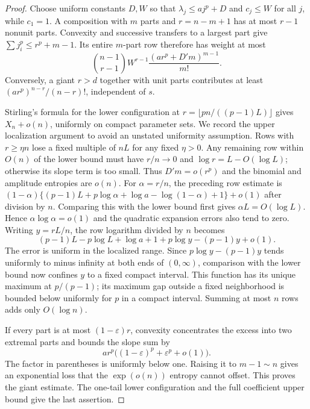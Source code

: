 \documentclass[11pt,a4paper]{article}
\numberwithin{equation}{section}
\theoremstyle{definition}
\theoremstyle{remark}
\begin{document}
\begin{proof}
Choose uniform constants $D,W$ so that
$\lambda_j\le a j^p+D$ and $c_j\le W$ for all $j$, while $c_1=1$.
A composition with $m$ parts and $r=n-m+1$ has at most $r-1$ nonunit
parts. Convexity and successive transfers to a largest part give
$\sum j_i^p\le r^p+m-1$. Its entire $m$-part row therefore has weight at
most
\begin{equation}
 \binom{n-1}{r-1}W^{r-1}
 \frac{(a r^p+D'm)^{m-1}}{m!}.
 \label{eq:row}
\end{equation}
Conversely, a giant $r>d$ together with unit parts contributes at least
$(a r^p)^{n-r}/(n-r)!$, independent of $s$.

Stirling's formula for the lower configuration at
$r=\lfloor pn/((p-1)L)\rfloor$ gives $X_n+o(n)$, uniformly on compact
parameter sets. We record the upper localization argument to avoid an
unstated uniformity assumption. Rows with $r\ge\eta n$ lose a fixed
multiple of $nL$ for any fixed $\eta>0$. Any remaining row within $O(n)$
of the lower bound must have $r/n\to0$ and
$\log r=L-O(\log L)$; otherwise its slope term is too small.
Thus $D'm=o(r^p)$ and the binomial and amplitude entropies are $o(n)$.
For $\alpha=r/n$, the preceding row estimate is
$(1-\alpha)\{(p-1)L+p\log\alpha+\log a-\log(1-\alpha)+1\}+o(1)$
after division by $n$. Comparing this with the lower bound first gives
$\alpha L=O(\log L)$. Hence $\alpha\log\alpha=o(1)$ and the
quadratic expansion errors also tend to zero. Writing $y=rL/n$, the
row logarithm divided by $n$ becomes
\begin{equation}
 (p-1)L-p\log L+\log a+1+p\log y-(p-1)y+o(1).
 \label{eq:variational}
\end{equation}
The error is uniform in the localized range. Since
$p\log y-(p-1)y$ tends uniformly to minus infinity at both ends of
$(0,\infty)$, comparison with the lower bound now confines $y$ to a
fixed compact interval. This function has its unique maximum at $p/(p-1)$; its maximum gap
outside a fixed neighborhood is bounded below uniformly for $p$ in a
compact interval. Summing at most $n$ rows adds only $O(\log n)$.

If every part is at most $(1-\varepsilon)r$, convexity concentrates the
excess into two extremal parts and bounds the slope sum by
\[
 a r^p\bigl((1-\varepsilon)^p+\varepsilon^p+o(1)\bigr).
\]
The factor in parentheses is uniformly below one. Raising it to
$m-1\sim n$ gives an exponential loss that the $\exp(o(n))$ entropy
cannot offset. This proves the giant estimate. The one-tail lower
configuration and the full coefficient upper bound give the last assertion.
\end{proof}
\end{document}
